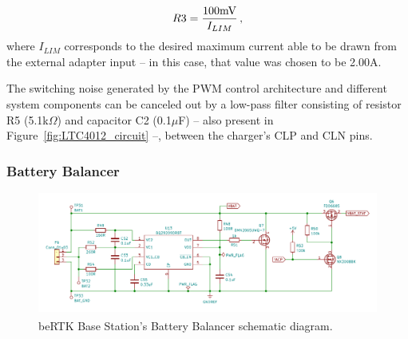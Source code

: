 \begin{equation}\label{eq:r_cl}
    R3=\frac{100\textrm{mV}}{I_{LIM}}\,,\medskip
\end{equation}
where $I_{LIM}$ corresponds to the desired maximum current able to be drawn from the external adapter input -- in this case, that value was chosen to be 2.00A.

The switching noise generated by the PWM control architecture and different system components can be canceled out by a low-pass filter consisting of resistor R5 (5.1k$\Omega$) and capacitor C2 (0.1$\mu$F) -- also present in Figure~\ref{fig:LTC4012_circuit} --, between the charger's CLP and CLN pins.



\subsubsection{Battery Balancer}\label{sec:3212_BQ29209}

\begin{figure}[h]
	\centering
	\includegraphics[width=1.0\textwidth]{Chapters/Figures/chapter3/Battery_Balancer.pdf}
	\caption{beRTK\textsuperscript{\textregistered} Base Station's Battery Balancer schematic diagram.}
	\label{fig:BQ29209_circuit}
\end{figure}

